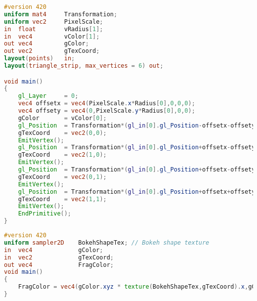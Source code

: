 \begin{lstlisting}[language=GLSL,float={htb},caption={Geometry shader for rendering bokeh \emph{(Pass 4)}.},label={DeRousiers:renderingbokehgs}]
#version 420
uniform mat4     Transformation;
uniform vec2     PixelScale;
in  float        vRadius[1];
in  vec4         vColor[1];
out vec4         gColor;
out vec2         gTexCoord;
layout(points)   in;
layout(triangle_strip, max_vertices = 6) out;

void main()
{
	gl_Layer     = 0;
	vec4 offsetx = vec4(PixelScale.x*Radius[0],0,0,0);
	vec4 offsety = vec4(0,PixelScale.y*Radius[0],0,0);
	gColor       = vColor[0];
	gl_Position  = Transformation*(gl_in[0].gl_Position-offsetx-offsety);
	gTexCoord    = vec2(0,0);
	EmitVertex();
	gl_Position  = Transformation*(gl_in[0].gl_Position+offsetx-offsety);
	gTexCoord    = vec2(1,0);
	EmitVertex();
	gl_Position  = Transformation*(gl_in[0].gl_Position+offsetx-offsety);
	gTexCoord    = vec2(0,1);
	EmitVertex();
	gl_Position  = Transformation*(gl_in[0].gl_Position+offsetx+offsety);
	gTexCoord    = vec2(1,1);
	EmitVertex();
	EndPrimitive();
}
\end{lstlisting}

\begin{lstlisting}[language=GLSL,float={htb},caption={Fragment shader for rendering bokeh \emph{(Pass 4)}.},label={DeRousiers:renderingbokehfs}]
#version 420
uniform sampler2D    BokehShapeTex; // Bokeh shape texture
in  vec4             gColor;
in  vec2             gTexCoord;
out vec4             FragColor;
void main()
{
	FragColor = vec4(gColor.xyz * texture(BokehShapeTex,gTexCoord).x,gColor.w);
}
\end{lstlisting}
















